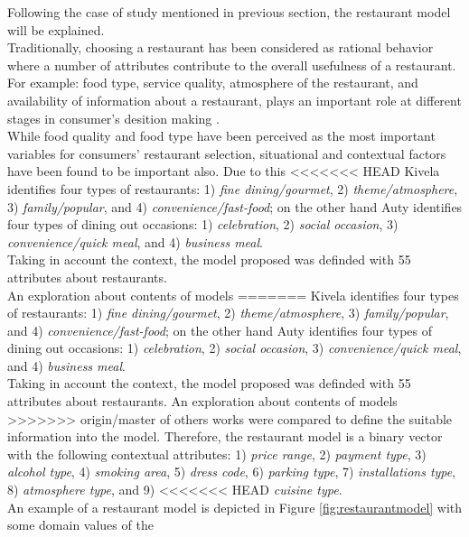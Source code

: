 Following the case of study mentioned in previous section,   the
restaurant model will be explained.\\  Traditionally, choosing a
restaurant has been considered as rational behavior where a number of
attributes contribute to the overall usefulness of a restaurant. For
example: food type, service quality, atmosphere of the restaurant, and
availability of information about a restaurant, plays an important
role at different stages in consumer's desition
making  \cite{auty1992consumer}. \\ 
While food quality and food type have
been perceived as the most important variables for consumers'
restaurant selection, situational and contextual factors have been
found to be important also. Due to this
<<<<<<< HEAD
Kivela  \cite{jack1997restaurant} identifies four types of restaurants:
1) \textit{fine dining/gourmet}, 2) \textit{theme/atmosphere}, 3)
\textit{family/popular}, and 4) \textit{convenience/fast-food}; on the
other hand Auty  \cite{auty1992consumer} identifies four types of dining
out occasions: 1) \textit{celebration}, 2) \textit{social occasion},
3) \textit{convenience/quick meal}, and 4) \textit{business meal}.\\
Taking in account the context, the model proposed was definded with 55
attributes about restaurants. \\ An exploration about contents of models
=======
Kivela\cite{jack1997restaurant} identifies four types of restaurants:
1) \textit{fine dining/gourmet}, 2) \textit{theme/atmosphere}, 3)
\textit{family/popular}, and 4) \textit{convenience/fast-food}; on the
other hand Auty\cite{auty1992consumer} identifies four types of dining
out occasions: 1) \textit{celebration}, 2) \textit{social occasion},
3) \textit{convenience/quick meal}, and 4) \textit{business meal}.\\
Taking in account the context, the model proposed was definded with 55
attributes about restaurants. An exploration about contents of models
>>>>>>> origin/master
of others works were compared to define the suitable information into
the model. Therefore, the restaurant model is a binary vector with the
following contextual attributes: 1) \textit{price range}, 2)
\textit{payment type}, 3) \textit{alcohol type}, 
4) \textit{smoking area}, 5) \textit{dress code}, 6) \textit{parking type}, 7)
\textit{installations type}, 8) \textit{atmosphere type}, and 9)
<<<<<<< HEAD
\textit{cuisine type}. \\ An example of a restaurant model is depicted in
Figure  \ref{fig:restaurantmodel} with some domain values of the
